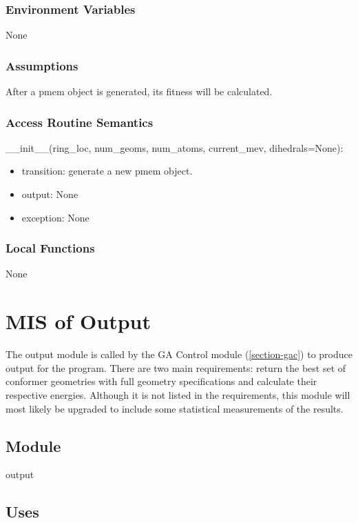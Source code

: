\documentclass[12pt, titlepage]{article}
\begin{document}
\subsubsection{Environment Variables}

None

\subsubsection{Assumptions}

After a pmem object is generated, its fitness will be calculated.

\subsubsection{Access Routine Semantics}

\noindent \_\_init\_\_(ring\_loc, num\_geoms, num\_atoms, current\_mev, 
dihedrals=None):
\begin{itemize}
	\item transition: generate a new pmem object.
	\item output: None
	\item exception: None
\end{itemize}

\subsubsection{Local Functions}

None

\section{MIS of Output} \label{section-output}

The output module is called by the GA Control module (\ref{section-gac}) to 
produce output for the program. There are two main requirements: return the 
best set of conformer geometries with full geometry specifications and 
calculate their respective energies. Although it is not listed in the 
requirements, this module will most likely be upgraded to include some 
statistical measurements of the results.

\subsection{Module}

output

\subsection{Uses}
\end{document}
